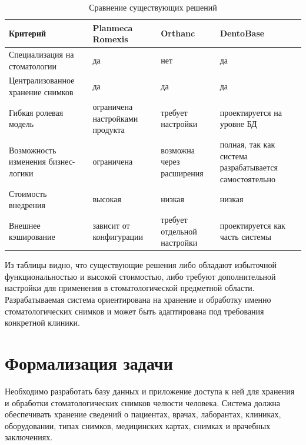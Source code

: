 \begin{table}[H]
	\caption{Сравнение существующих решений}
	\label{tab:analogs}
	\centering
	\small
	\begin{tabular}{|p{}|p{}|p{}|p{}|}
		\hline
		Критерий & Planmeca Romexis & Orthanc & DentoBase \\
		\hline
		Специализация на стоматологии & да & нет & да \\
		\hline
		Централизованное хранение снимков & да & да & да \\
		\hline
		Гибкая ролевая модель & ограничена настройками продукта & требует настройки & проектируется на уровне БД \\
		\hline
		Возможность изменения бизнес-логики & ограничена & возможна через расширения & полная, так как система разрабатывается самостоятельно \\
		\hline
		Стоимость внедрения & высокая & низкая & низкая \\
		\hline
		Внешнее кэширование & зависит от конфигурации & требует отдельной настройки & проектируется как часть системы \\
		\hline
	\end{tabular}
\end{table}

Из таблицы видно, что существующие решения либо обладают избыточной функциональностью и высокой стоимостью, либо требуют дополнительной настройки для применения в стоматологической предметной области. Разрабатываемая система ориентирована на хранение и обработку именно стоматологических снимков и может быть адаптирована под требования конкретной клиники.

\section{Формализация задачи}

Необходимо разработать базу данных и приложение доступа к ней для хранения и обработки стоматологических снимков челюсти человека. Система должна обеспечивать хранение сведений о пациентах, врачах, лаборантах, клиниках, оборудовании, типах снимков, медицинских картах, снимках и врачебных заключениях.

